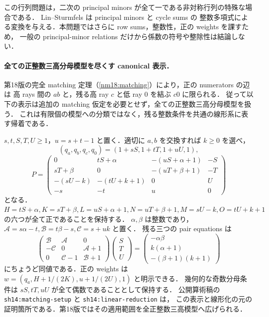 この行列問題は，二次の principal minors が全て一である非対称行列の特殊な場合である．
Lin--Sturmfels\cite[\S2, Proposition~4]{LinSturmfels} は principal minors と cycle sums の
整数多項式による変換を与える．本問題ではさらに row sums，整数性，正の weights を課すため，
一般の principal-minor relations だけから係数の符号や整除性は結論しない．

\paragraph{全ての正整数三高分母模型を尽くす canonical 表示．}
第18版の完全 matching 定理（\ref{nm18:matching}）により，正の numerators の辺は
高 rays 間の $ab$ と，残る高 ray $c$ と低 ray $0$ を結ぶ $c0$ に限られる．
従って以下の表示は追加の matching 仮定を必要とせず，全ての正整数三高分母模型を扱う．
これは有限個の模型への分類ではなく，残る整数条件を共通の線形系に表す帰着である．

$s,t,S,T,U\ge1$，$u=s+t-1$ と置く．適切に $a,b$ を交換すれば $k\ge0$ を選べ，
\[
 (q_a,q_b,q_c,q_0)=(1+sS,1+tT,1+uU,1),
\]
\[
 P=\begin{pmatrix}
 0&tS+\alpha&-(uS+\alpha+1)&-S\\
 sT+\beta&0&-(uT+\beta+1)&-T\\
 -(sU-k)&-(tU+k+1)&0&U\\
 -s&-t&u&0
 \end{pmatrix}
\]
となる．$H=tS+\alpha,K=sT+\beta,L=uS+\alpha+1,N=uT+\beta+1,
M=sU-k,O=tU+k+1$ の六つが全て正であることを保持する．
$\alpha,\beta$ は整数であり，
$\mathcal A=s\alpha-t,\mathcal B=t\beta-s,\mathcal C=s+uk$ と置く．
残る三つの pair equations は
\[
 \begin{pmatrix}
  \mathcal B&\mathcal A&0\\
  -\mathcal C&0&\mathcal A+1\\
  0&\mathcal C-1&\mathcal B+1
 \end{pmatrix}
 \begin{pmatrix}S\\T\\U\end{pmatrix}
 =\begin{pmatrix}
 -\alpha\beta\\k(\alpha+1)\\-(\beta+1)(k+1)
 \end{pmatrix}
\]
にちょうど同値である．正の weights は
$w=(q_a,H+1/(2K),u+1/(2U),1)$ と明示できる．
幾何的な奇数分母条件は $sS,tT,uU$ が全て偶数であることとして保持する．
公開算術稿の \texttt{sh14:matching-setup} と \texttt{sh14:linear-reduction} は，
この表示と線形化の元の証明箇所である．第18版ではその適用範囲を全正整数三高模型へ広げられる．

